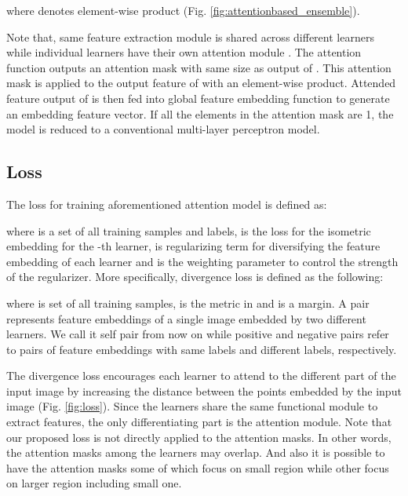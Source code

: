 \documentclass[runningheads]{llncs}
\begin{document}
where  denotes element-wise product (Fig. \ref{fig:attentionbased_ensemble}).

Note that, same feature extraction module is shared across different learners while individual learners have their own attention module .
The attention function  outputs an attention mask with same size as output of .
This attention mask is applied to the output feature of  with an element-wise product.
Attended feature output of  is then fed into global feature embedding function
  to generate an embedding feature vector.
If all the elements in the attention mask are 1, the model  is reduced to a conventional multi-layer perceptron model.

\vspace{-4mm}
\subsection{Loss}
\label{sec:loss}
\vspace{-2mm}

The loss for training aforementioned attention model is defined as:

\vspace{-2mm}

where  is a set of all training samples and labels,  is the loss for the isometric embedding for the -th learner,  is regularizing term for diversifying the feature embedding of each learner  and  is the weighting parameter to control the strength of the regularizer. More specifically, divergence loss  is defined as the following:

\vspace{-2mm}

where  is set of all training samples,  is the metric in  and  is a margin.
A pair  represents feature embeddings of a single image embedded by two different learners.
We call it self pair from now on
while positive and negative pairs refer to pairs of feature embeddings with same labels and different labels, respectively.

The divergence loss encourages each learner to attend to the different part of the input image by increasing the distance between the points embedded by the input image (Fig. \ref{fig:loss}).
Since the learners share the same functional module to extract features, the only differentiating part is the attention module.
Note that our proposed loss is not directly applied to the attention masks.
In other words, the attention masks among the learners may overlap.
And also it is possible to have the attention masks some of which focus on small region while other focus on larger region including small one.
 
\end{document}
